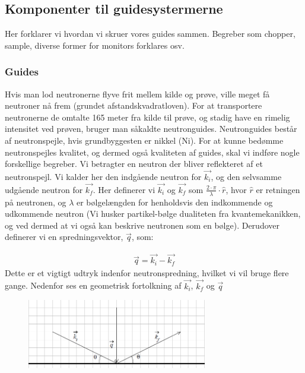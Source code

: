 \documentclass[12pt,oneside,a4paper]{article}
\begin{document}
{{{{{\subsection{Komponenter til guidesystermerne}
Her forklarer vi hvordan vi skruer vores guides sammen. Begreber som chopper, sample, diverse former for monitors forklares osv.

\subsubsection{Guides}

Hvis man lod neutronerne flyve frit mellem kilde og prøve, ville meget få neutroner nå frem (grundet afstandskvadratloven). For at transportere neutronerne de omtalte 165 meter fra kilde til prøve, og stadig have en rimelig intensitet ved prøven, bruger man såkaldte neutronguides. Neutronguides består af neutronspejle, hvis grundbyggesten er nikkel (Ni).
For at kunne bedømme neutronspejles kvalitet, og dermed også kvaliteten af guides, skal vi indføre nogle forskellige begreber. Vi betragter en neutron der bliver reflekteret af et neutronspejl. Vi kalder her den indgående neutron for $\vec{k_i}$, og den selvsamme udgående neutron for  $\vec{k_f}$. Her definerer vi $\vec{k_i}$ og $\vec{k_f}$ som  $ {\frac{2 \cdot \pi}{\lambda}} \cdot \hat{r}$, hvor $\hat{r}$ er retningen på neutronen, og $\lambda$ er bølgelængden for henholdsvis den indkommende og udkommende neutron (Vi husker partikel-bølge dualiteten fra kvantemekanikken, og ved dermed at vi også kan beskrive neutronen som en bølge). Derudover definerer vi en spredningsvektor, $\vec{q}$, som:

\begin{align}
\vec{q}=\vec{k_i}-\vec{k_f}
\end{align}
Dette er et vigtigt udtryk indenfor neutronspredning, hvilket vi vil bruge flere gange. Nedenfor ses en geometrisk fortolkning af $\vec{k_i}$, $\vec{k_f}$  og $ \vec{q}$

\begin{figure}[H]
\centering
\includegraphics[width=0.7\textwidth]{billede3.png}
\caption{\label{Billede}}
\end{figure}

}}}}}
\end{document}
